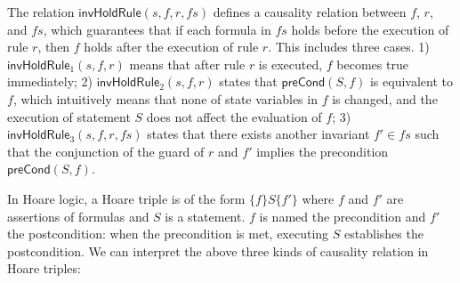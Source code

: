 \documentclass[final]{IEEEtran}
\newlength{\fminilength}
\newenvironment{fmini}[1][\linewidth]
  {\setlength{\fminilength}{#1\fboxsep-2\fboxrule}%
   \vspace{2ex}\noindent\begin{lrbox}{\fminibox}\begin{minipage}{\fminilength}%
   \mbox{ }\hfill\vspace{-2.5ex}}%
  {\end{minipage}\end{lrbox}\vspace{1ex}\hspace{0ex}%
   \framebox{\usebox{\fminibox}}}
\newenvironment{specification}
{\noindent\scriptsize
\tt\begin{fmini}\begin{tabbing}X\=X12345\=XXXX\=XXXX\=XXXX\=XXXX\=XXXX
\=\+\kill} {\end{tabbing}\normalfont\end{fmini}}
\newcommand \hoareTriple[3] {$\{#1\} #2  \{#3\}$}
\begin{document}
{%








The relation $\mathsf{invHoldRule}(s, f,r,fs)$ defines a causality relation
between $f$, $r$, and $fs$, which guarantees that if each formula in $fs$ holds
before the execution of rule $r$, then $f$ holds after the execution of rule $r$. This includes three cases. 1) $\mathsf{invHoldRule}_1(s,f, r)$ means that after rule $r$ is executed, $f$ becomes true immediately;   2) $\mathsf{invHoldRule}_2(s,f, r)$ states that $\mathsf{preCond}(S,f)$ is equivalent to $f$, which intuitively means that none of state variables in $f$ is changed, and the execution of statement $S$ does not affect the evaluation of $f$;
 3) $\mathsf{invHoldRule}_3(s,f, r,fs)$ states that there exists another invariant $f' \in fs$ such that
  the conjunction of the guard of $r$ and $f'$ implies the precondition  $\mathsf{preCond}(S,f)$.

In Hoare logic, a Hoare triple is of the form \hoareTriple{f}{ S} {f'}
where $f$ and $f'$ are assertions of formulas and $S$ is a statement.  $f$  is named the precondition and $f'$ the postcondition: when the precondition is met, executing $S$ establishes the postcondition. We can interpret the above three kinds of causality relation in   Hoare triples:

}
\end{document}
